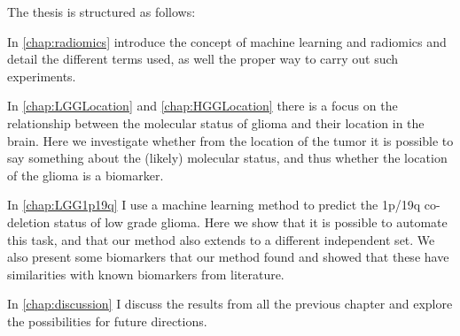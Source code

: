The thesis is structured as follows:

In \cref{chap:radiomics} introduce the concept of machine learning and radiomics and detail the different terms used, as well the proper way to carry out such experiments.

In \cref{chap:LGGLocation} and \cref{chap:HGGLocation} there is a focus on the relationship between the molecular status of glioma and their location in the brain.
Here we investigate whether from the location of the tumor it is possible to say something about the (likely) molecular status, and thus whether the location of the glioma is a biomarker.

In \cref{chap:LGG1p19q} I use a machine learning method to predict the 1p/19q co-deletion status of low grade glioma.
Here we show that it is possible to automate this task, and that our method also extends to a different independent set.
We also present some biomarkers that our method found and showed that these have similarities with known biomarkers from literature.

In \cref{chap:discussion} I discuss the results from all the previous chapter and explore the possibilities for future directions.

